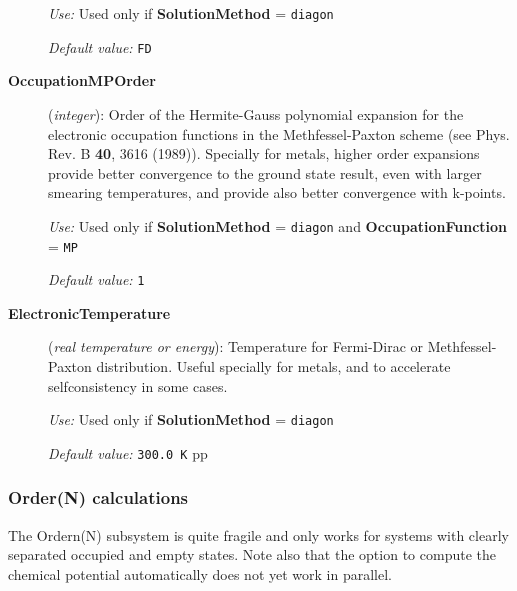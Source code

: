 \documentclass[11pt]{article}
\begin{document}
\begin{description}
{\it Use:} Used only if {\bf SolutionMethod} = {\tt diagon}

{\it Default value:} {\tt FD}

\item[{\bf OccupationMPOrder}]({\it integer}):
Order of the Hermite-Gauss polynomial expansion for the
electronic occupation functions in the Methfessel-Paxton
scheme (see Phys. Rev. B  {\bf 40}, 3616 (1989)).
Specially for metals, higher order expansions provide better convergence
to the ground state result, even with larger smearing
temperatures, and provide also better convergence with k-points.


{\it Use:} Used only if {\bf SolutionMethod} = {\tt diagon}
and {\bf OccupationFunction} =  {\tt MP}

{\it Default value:} {\tt 1}



\item[{\bf ElectronicTemperature}] ({\it real temperature or energy}):
Temperature for Fermi-Dirac or Methfessel-Paxton
distribution. Useful specially for
metals, and to accelerate selfconsistency in some cases.

{\it Use:} Used only if {\bf SolutionMethod} = {\tt diagon}

{\it Default value:} {\tt 300.0 K}
pp

\end{description}

\subsubsection{Order(N) calculations}

The Ordern(N) subsystem is quite fragile and only works for systems
with clearly separated occupied and empty states. Note also that the
option to compute the chemical potential automatically does not yet
work in parallel.
\end{document}

